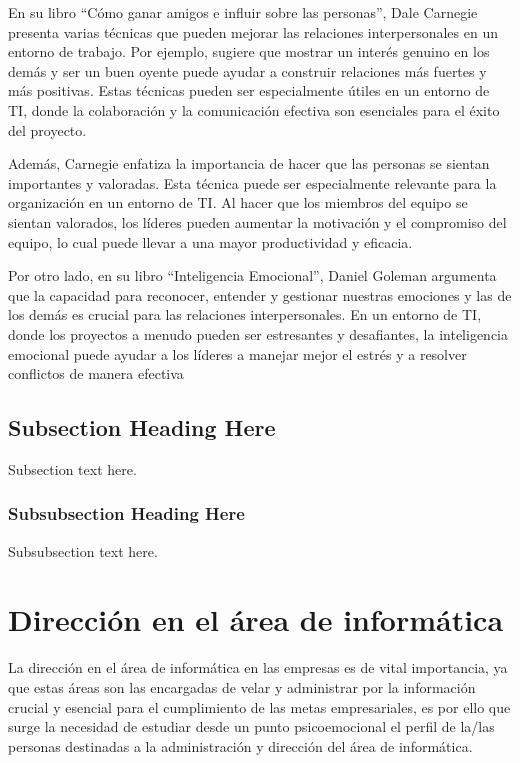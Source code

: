 \documentclass[journal]{IEEEtran}
\begin{document}
En su libro “Cómo ganar amigos e influir sobre las personas”, Dale Carnegie presenta varias técnicas que pueden mejorar las relaciones interpersonales en un entorno de trabajo. Por ejemplo, sugiere que mostrar un interés genuino en los demás y ser un buen oyente puede ayudar a construir relaciones más fuertes y más positivas. Estas técnicas pueden ser especialmente útiles en un entorno de TI, donde la colaboración y la comunicación efectiva son esenciales para el éxito del proyecto.

Además, Carnegie enfatiza la importancia de hacer que las personas se sientan importantes y valoradas. Esta técnica puede ser especialmente relevante para la organización en un entorno de TI. Al hacer que los miembros del equipo se sientan valorados, los líderes pueden aumentar la motivación y el compromiso del equipo, lo cual puede llevar a una mayor productividad y eficacia.

Por otro lado, en su libro “Inteligencia Emocional”, Daniel Goleman argumenta que la capacidad para reconocer, entender y gestionar nuestras emociones y las de los demás es crucial para las relaciones interpersonales. En un entorno de TI, donde los proyectos a menudo pueden ser estresantes y desafiantes, la inteligencia emocional puede ayudar a los líderes a manejar mejor el estrés y a resolver conflictos de manera efectiva

\subsection{Subsection Heading Here}
Subsection text here.

\subsubsection{Subsubsection Heading Here}
Subsubsection text here.



\section{Dirección en el área de informática}
La dirección en el área de informática en las empresas es de vital importancia, ya que estas áreas son las encargadas de velar y administrar por la información crucial y esencial para el cumplimiento de las metas empresariales, es por ello que surge la necesidad de estudiar desde un punto psicoemocional el perfil de la/las personas destinadas a la administración y dirección del área de informática.
\end{document}
